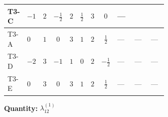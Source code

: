 \documentclass[8pt]{article}
\begin{document}
\begin{landscape}
\begin{longtable}{@{}llcccccc >{\raggedright\arraybackslash}p{0.21\linewidth} >{\raggedright\arraybackslash}p{0.21\linewidth} >{\raggedright\arraybackslash}p{0.21\linewidth}@{}}
\midrule
T3-C & $-1$ & $2$ & $-\frac{1}{2}$ & $2$ & $\frac{1}{2}$ & $3$ & $0$ & --- & \scriptsize\adjustbox{max width=\linewidth}{$\begin{gathered} +{\lambda_{10}} \left(\frac{9}{4} \operatorname{Tr}\!\left({y_1}\,\left({y_2}\right)^{\dagger}\right)+9 (\left({\lambda_{10}}\right)^{*}+\left({\lambda_{11}}\right)^{*})\right) \\ +{\lambda_{11}} \left(\frac{9}{4} \operatorname{Tr}\!\left({y_1}\,\left({y_2}\right)^{\dagger}\right)+9 (\left({\lambda_{10}}\right)^{*}+\left({\lambda_{11}}\right)^{*})\right)\end{gathered}$} & \scriptsize\adjustbox{max width=\linewidth}{$\begin{gathered} +\frac{9}{4} (\left({\lambda_{10}}\right)^{*}+\left({\lambda_{11}}\right)^{*}) \operatorname{Tr}\!\left({y_2}\,\left({y_1}\right)^{\dagger}\right)\end{gathered}$} \\
\midrule
T3-A & $0$ & $1$ & $0$ & $3$ & $1$ & $2$ & $\frac{1}{2}$ & --- & --- & --- \\
\midrule
T3-D & $-2$ & $3$ & $-1$ & $1$ & $0$ & $2$ & $-\frac{1}{2}$ & --- & --- & --- \\
\midrule
T3-E & $0$ & $3$ & $0$ & $3$ & $1$ & $2$ & $\frac{1}{2}$ & --- & --- & --- \\
\midrule
\bottomrule
\end{longtable}
\clearpage
\noindent\textbf{Quantity: }$\lambda_{12}^{(1)}$\par\smallskip

\end{landscape}
\end{document}
